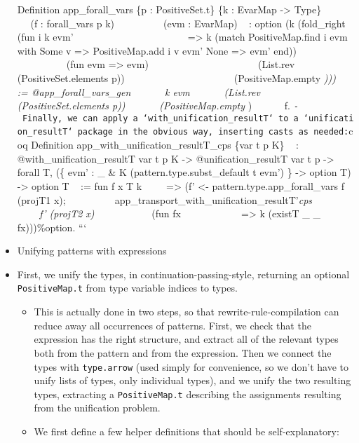 \begin{itemize}
  Definition app\_forall\_vars \{p : PositiveSet.t\} \{k : EvarMap
  -\textgreater{} Type\} ~ ~ ~ ~ ~ ~(f : forall\_vars p k) ~ ~ ~ ~ ~
  ~(evm : EvarMap) ~ : option (k (fold\_right (fun i k evm' ~ ~ ~ ~ ~ ~
  ~ ~ ~ ~ ~ ~ ~ ~=\textgreater{} k (match PositiveMap.find i evm with
  Some v =\textgreater{} PositiveMap.add i v evm' \textbar{} None
  =\textgreater{} evm' end)) ~ ~ ~ ~ ~ ~ ~ ~ ~ ~ ~ ~ ~ (fun evm
  =\textgreater{} evm) ~ ~ ~ ~ ~ ~ ~ ~ ~ ~ ~ ~ ~ (List.rev
  (PositiveSet.elements p)) ~ ~ ~ ~ ~ ~ ~ ~ ~ ~ ~ ~ ~ (PositiveMap.empty
  \emph{))) ~ := @app\_forall\_vars\_gen ~ ~ ~ ~k evm ~ ~ ~ ~(List.rev
  (PositiveSet.elements p)) ~ ~ ~ ~(PositiveMap.empty }) ~ ~ ~ ~f.
  \texttt{-\ Finally,\ we\ can\ apply\ a\ `with\_unification\_resultT`\ to\ a\ `unification\_resultT`\ package\ in\ the\ obvious\ way,\ inserting\ casts\ as\ needed:}coq
  Definition app\_with\_unification\_resultT\_cps \{var t p K\} ~ :
  @with\_unification\_resultT var t p K -\textgreater{}
  @unification\_resultT var t p -\textgreater{} forall T, (\{ evm' : \_
  \& K (pattern.type.subst\_default t evm') \} -\textgreater{} option T)
  -\textgreater{} option T ~ := fun f x T k ~ ~ ~=\textgreater{} (f'
  \textless{}- pattern.type.app\_forall\_vars f (projT1 x); ~ ~ ~ ~ ~
  ~app\_transport\_with\_unification\_resultT'\emph{cps ~ ~ ~ ~ ~ ~ ~f'
  (projT2 x) } ~ ~ ~ ~ ~ ~ ~(fun fx ~ ~ ~ ~ ~ ~ ~ =\textgreater{} k
  (existT \_ \_ fx)))\%option. ```
\item
  Unifying patterns with expressions
\item
  First, we unify the types, in continuation-passing-style, returning an
  optional \texttt{PositiveMap.t} from type variable indices to types.

  \begin{itemize}
  \item
    This is actually done in two steps, so that rewrite-rule-compilation
    can reduce away all occurrences of patterns. First, we check that
    the expression has the right structure, and extract all of the
    relevant types both from the pattern and from the expression. Then
    we connect the types with \texttt{type.arrow} (used simply for
    convenience, so we don't have to unify lists of types, only
    individual types), and we unify the two resulting types, extracting
    a \texttt{PositiveMap.t} describing the assignments resulting from
    the unification problem.
  \item
    We first define a few helper definitions that should be
    self-explanatory:


\end{itemize}
\end{itemize}
